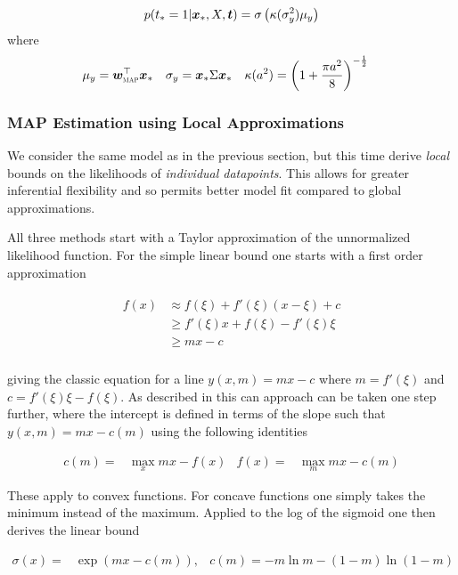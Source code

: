 \begin{align}
p(t_* = 1 | \bm x_*, X, \bm t) = \sigma\left( \kappa(\sigma_y^2) \mu_y \right)
\end{align}
where
\begin{align}
\mu_y       & = \bm w_{\text{\tiny \sc MAP}}^\top\bm x_* &
\sigma_y    & = \bm x_* \Sigma \bm x_* &
\kappa(a^2) & = \left( 1 + \frac{\pi a^2}{8}  \right)^{-\frac{1}{2}}
\end{align}

\subsubsection*{MAP Estimation using Local Approximations}

We consider the same model as in the previous section, but this time derive \emph{local} bounds on the likelihoods of \emph{individual datapoints}. This allows for greater inferential flexibility and so permits better model fit compared to global approximations\cite{Jaakkola1997}.

All three methods start with a Taylor approximation of the unnormalized likelihood function. For the simple linear bound one starts with a first order approximation

\begin{align}
\begin{split}
f(x) & \approx f(\xi) + f'(\xi) (x - \xi) + c \\
 & \geq f'(\xi) x + f(\xi) - f'(\xi)\xi \\
 & \geq m x - c \\
\end{split}
\end{align}

giving the classic equation for a line $y(x, m) = mx - c$ where $m = f'(\xi)$ and $c = f'(\xi)\xi - f(\xi)$. As described in \cite{JordanBook1999} this can approach can be taken one step further, where the intercept is defined in terms of the slope such that $y(x, m) = mx - c(m)$ using the following identities

\begin{align}
c(m) = & \max _x mx - f(x) & f(x) = & \max _m mx - c(m)
\end{align}

These apply to convex functions. For concave functions one simply takes the minimum instead of the maximum. Applied to the log of the sigmoid one then derives the linear bound

\begin{align}
\sigma(x) = & \exp(mx - c(m)), & c(m) = -m \ln m - (1-m) \ln (1-m)
\end{align}

